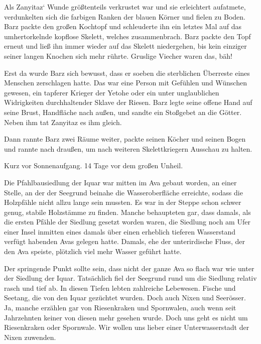Als Zanyitaz‘ Wunde größtenteils verkrustet war und sie erleichtert aufatmete, verdunkelten sich die farbigen Ranken der blauen Körner und fielen zu Boden. Barz packte den großen Kochtopf und schleuderte ihn ein letztes Mal auf das umhertorkelnde kopflose Skelett, welches zusammenbrach. Barz packte den Topf erneut und ließ ihn immer wieder auf das Skelett niedergehen, bis kein einziger seiner langen Knochen sich mehr rührte. Gruslige Viecher waren das, bäh!

Erst da wurde Barz sich bewusst, dass er soeben die sterblichen Überreste eines Menschen zerschlagen hatte. Das war eine Person mit Gefühlen und Wünschen gewesen, ein tapferer Krieger der Yetohe oder ein unter unglaublichen Widrigkeiten durchhaltender Sklave der Riesen. Barz legte seine offene Hand auf seine Brust, Handfläche nach außen, und sandte ein Stoßgebet an die Götter. Neben ihm tat Zanyitaz es ihm gleich.

Dann rannte Barz zwei Räume weiter, packte seinen Köcher und seinen Bogen und rannte nach draußen, um nach weiteren Skelettkriegern Ausschau zu halten.



\trennzeichen



Kurz vor Sonnenaufgang. 14 Tage vor dem großen Unheil.\bigskip



Die Pfahlbausiedlung der Iquar war mitten im Ava gebaut worden, an einer Stelle, an der der Seegrund beinahe die Wasseroberfläche erreichte, sodass die Holzpfähle nicht allzu lange sein mussten. Es war in der Steppe schon schwer genug, stabile Holzstämme zu finden. Manche behaupteten gar, dass damals, als die ersten Pfähle der Siedlung gesetzt worden waren, die Siedlung noch am Ufer einer Insel inmitten eines damals über einen erheblich tieferen Wasserstand verfügt habenden Avas gelegen hatte. Damals, ehe der unterirdische Fluss, der den Ava speiste, plötzlich viel mehr Wasser geführt hatte.

Der springende Punkt sollte sein, dass nicht der ganze Ava so flach war wie unter der Siedlung der Iquar. Tatsächlich fiel der Seegrund rund um die Siedlung relativ rasch und tief ab. In diesen Tiefen lebten zahlreiche Lebewesen. Fische und Seetang, die von den Iquar gezüchtet wurden. Doch auch Nixen und Seerösser. Ja, manche erzählen gar von Riesenkraken und Spornwalen, auch wenn seit Jahrzehnten keiner von diesen mehr gesehen wurde. Doch uns geht es nicht um Riesenkraken oder Spornwale. Wir wollen uns lieber einer Unterwasserstadt der Nixen zuwenden.

